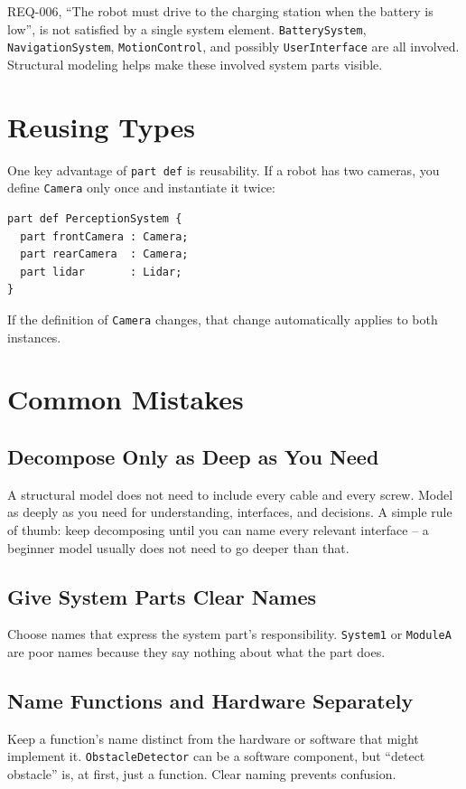 \begin{praxisbox}
REQ-006, \enquote{The robot must drive to the charging station when the battery is low}, is not satisfied by a single system element. \texttt{BatterySystem}, \texttt{NavigationSystem}, \texttt{MotionControl}, and possibly \texttt{UserInterface} are all involved. Structural modeling helps make these involved system parts visible.
\end{praxisbox}

\section{Reusing Types}
One key advantage of \texttt{part def} is reusability. If a robot has two cameras, you define \texttt{Camera} only once and instantiate it twice:

\begin{lstlisting}
part def PerceptionSystem {
  part frontCamera : Camera;
  part rearCamera  : Camera;
  part lidar       : Lidar;
}
\end{lstlisting}

If the definition of \texttt{Camera} changes, that change automatically applies to both instances.

\section{Common Mistakes}
\subsection{Decompose Only as Deep as You Need}
A structural model does not need to include every cable and every screw. Model as deeply as you need for understanding, interfaces, and decisions. A simple rule of thumb: keep decomposing until you can name every relevant interface -- a beginner model usually does not need to go deeper than that.

\subsection{Give System Parts Clear Names}
Choose names that express the system part's responsibility. \texttt{System1} or \texttt{ModuleA} are poor names because they say nothing about what the part does.

\subsection{Name Functions and Hardware Separately}
Keep a function's name distinct from the hardware or software that might implement it. \texttt{ObstacleDetector} can be a software component, but \enquote{detect obstacle} is, at first, just a function. Clear naming prevents confusion.

